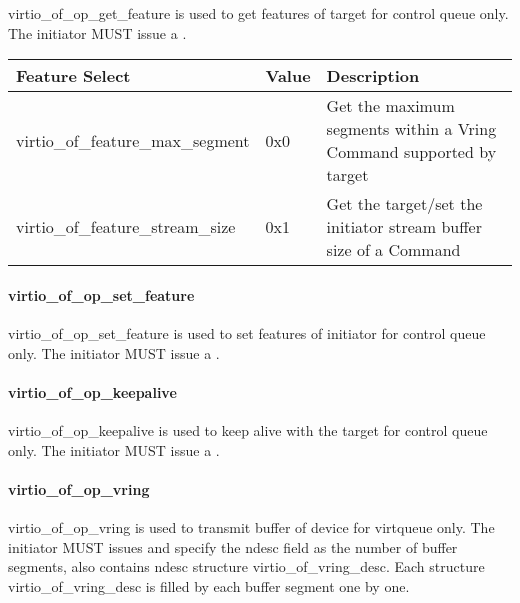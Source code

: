 virtio_of_op_get_feature is used to get features of target for control queue only. The initiator MUST issue a .

\begin{tabular}{ |l|l|l| }
\hline
Feature Select & Value & Description \\
\hline
virtio_of_feature_max_segment & 0x0 & Get the maximum segments within a Vring Command supported by target \\
\hline
virtio_of_feature_stream_size & 0x1 & Get the target/set the initiator stream buffer size of a Command \\
\hline
\end{tabular}

\paragraph{virtio_of_op_set_feature}\label{sec:Virtio Transport Options / Virtio Over Fabrics / Transmission Protocol / Opcodes Definition / virtio_of_op_set_feature}

virtio_of_op_set_feature is used to set features of initiator for control queue only. The initiator MUST issue a .

\paragraph{virtio_of_op_keepalive}\label{sec:Virtio Transport Options / Virtio Over Fabrics / Transmission Protocol / Opcodes Definition / virtio_of_op_keepalive}

virtio_of_op_keepalive is used to keep alive with the target for control queue only. The initiator MUST issue a .

\paragraph{virtio_of_op_vring}\label{sec:Virtio Transport Options / Virtio Over Fabrics / Transmission Protocol / Opcodes Definition / virtio_of_op_vring}

virtio_of_op_vring is used to transmit buffer of device for virtqueue only. The initiator MUST issues  and specify the ndesc field as the number of buffer segments, also contains ndesc structure virtio_of_vring_desc. Each structure virtio_of_vring_desc is filled by each buffer segment one by one.

